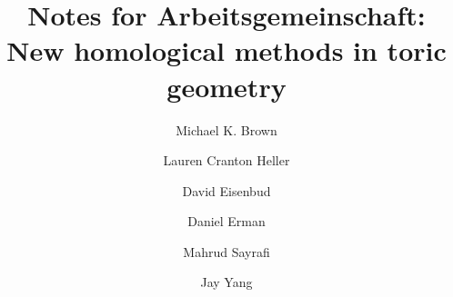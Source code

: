 \nc{\del}{\partial}
\nc{\wO}{\widehat{\OO}}
\nc{\from}{\leftarrow}
\nc{\wLL}{\widetilde{\LL}}
\nc{\augCech}{\widetilde{\cC}}
\nc{\intHom}{\underline{\Hom}}
\def\tP{\widetilde{P}}
\def\b{\beta}
\nc{\tR}{\widetilde{\cR}}
\def\co{\colon}
\def\ce{\coloneqq}
\def\E{\mathcal{E}}
\def\ex{\on{ex}}
\def\D{D}
\def\lin{\on{lin}}
\def\g{\gamma}
\nc{\tU}{\U}
\def\d{\mathbf{d}}
\def\phi{\varphi}
\def\cP{\mathcal{P}}
\def\I{\mathcal{I}}
\def\geo{\on{geo}}
\def\T{\mathbf{T}}
\nc{}
\def\Y{\mathcal{Y}}
\def\bL{\mathbf{L}}
\def\k{\mathbf{k}}
\def\e{\epsilon}
\def\sX{\mathcal X}
\def\tsX{\widetilde{\mathcal X}}
\def\epsilon{\varepsilon}
\def\w{\mathbf w}
\def\colim{\on{colim}}
\def\fix#1{{{\bf ***}#1{\bf ***}}}
\def\xla{\xleftarrow}
\title[New homological methods in toric geometry]{Notes for Arbeitsgemeinschaft:  \\ New homological methods in toric geometry}
\author{Michael K. Brown}
\author{Lauren Cranton Heller}
\author{David Eisenbud}
\author{Daniel Erman}
\author{Mahrud Sayrafi}
\author{Jay Yang}
\def\MR#1{}

\let\dotlessi\i
\def\i{\ifmmode\iota\else\dotlessi\fi}

\newcommand{\xto} {\xrightarrow}
\newcommand{\xgets}{\xleftarrow}
